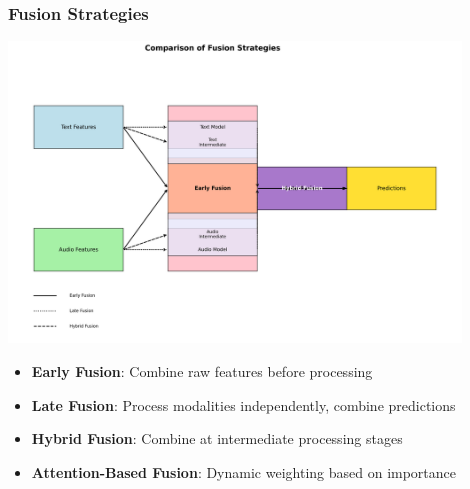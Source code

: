 \documentclass{beamer}
\begin{document}
\begin{frame}
\frametitle{Fusion Strategies}
\begin{center}
\includegraphics[width=0.9\textwidth]{figures/fusion_strategies.png}
\end{center}

\begin{itemize}
    \item \textbf{Early Fusion}: Combine raw features before processing
    \item \textbf{Late Fusion}: Process modalities independently, combine predictions
    \item \textbf{Hybrid Fusion}: Combine at intermediate processing stages
    \item \textbf{Attention-Based Fusion}: Dynamic weighting based on importance
\end{itemize}
\end{frame}
\end{document}
